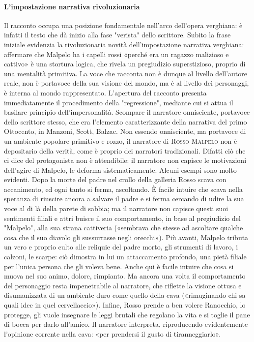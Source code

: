 \documentclass{book}
\newcounter{mar}
\begin{document}
\paragraph{L'impostazione narrativa rivoluzionaria} Il racconto occupa una posizione fondamentale nell'arco dell'opera verghiana: è infatti il testo che dà inizio alla fase "verista" dello scrittore. Subito la frase iniziale evidenzia la rivoluzionaria novità dell'impostazione narrativa verghiana: affermare che Malpelo ha i capelli rossi «perché era un ragazzo malizioso e cattivo» è una stortura logica, che rivela un pregiudizio superstizioso, proprio di una mentalità primitiva. La voce che racconta non è dunque al livello dell'autore reale, non è portavoce della sua visione del mondo, ma è al livello dei personaggi, è interna al mondo rappresentato. L'apertura del racconto presenta immediatamente il procedimento della "regressione", mediante cui si attua il basilare principio dell'impersonalità. Scompare il narratore onnisciente, portavoce dello scrittore stesso, che era l'elemento caratterizzante della narrativa del primo Ottocento, in Manzoni, Scott, Balzac. Non essendo onnisciente, ma portavoce di un ambiente popolare primitivo e rozzo, il narratore di \textsc{Rosso Malpelo} non è depositario della verità, come è proprio dei narratori tradizionali. Difatti ciò che ci dice del protagonista non è attendibile: il narratore non capisce le motivazioni dell'agire di Malpelo, le deforma sistematicamente. Alcuni esempi sono molto evidenti. Dopo la morte del padre nel crollo della galleria Rosso scava con accanimento, ed ogni tanto si ferma, ascoltando. È facile intuire che scava nella speranza di riuscire ancora a salvare il padre e si ferma cercando di udire la sua voce al di là della parete di sabbia; ma il narratore non capisce questi suoi sentimenti filiali e attri buisce il suo comportamento, in base al pregiudizio del "Malpelo", alla sua strana cattiveria («sembrava che stesse ad ascoltare qualche cosa che il suo diavolo gli sussurrasse negli orecchi»). Più avanti, Malpelo tributa un vero e proprio culto alle reliquie del padre morto, gli strumenti di lavoro, i calzoni, le scarpe: ciò dimostra in lui un attaccamento profondo, una pietà filiale per l'unica persona che gli voleva bene. Anche qui è facile intuire che cosa si muova nel suo animo, dolore, rimpianto. Ma ancora una volta il comportamento del personaggio resta impenetrabile al narratore, che riflette la visione ottusa e disumanizzata di un ambiente duro come quello della cava («rimuginando chi sa quali idee in quel cervellaccio»). Infine, Rosso prende a ben volere Ranocchio, lo protegge, gli vuole insegnare le leggi brutali che regolano la vita e si toglie il pane di bocca per darlo all'amico. Il narratore interpreta, riproducendo evidentemente l'opinione corrente nella cava: «per prendersi il gusto di tiranneggiarlo».
\end{document}
